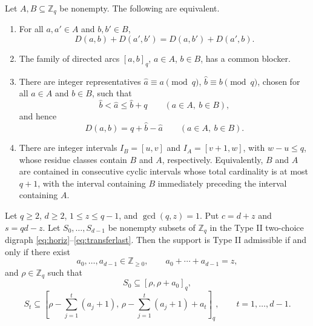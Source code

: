 \documentclass[10pt,a4paper]{amsart}
\begin{document}
\begin{lemma}
\label{lem:separation}
Let $A,B\subseteq\mathbb Z_q$ be nonempty.  The following are equivalent.
\begin{enumerate}[label=\textup{(\roman*)}]
\item For all $a,a'\in A$ and $b,b'\in B$,
\begin{equation}
        D(a,b)+D(a',b')=D(a,b')+D(a',b).
        \label{eq:monge}
\end{equation}
\item The family of directed arcs $[a,b]_q$, $a\in A$, $b\in B$, has a common blocker.
\item There are integer representatives $\widehat a\equiv a\pmod q$, $\widehat b\equiv b\pmod q$, chosen for all $a\in A$ and $b\in B$, such that
\begin{equation}
        \widehat b<\widehat a\le \widehat b+q
        \qquad(a\in A,\ b\in B),
        \label{eq:separated-lifts-order}
\end{equation}
 and hence
\begin{equation}
        D(a,b)=q+\widehat b-\widehat a
        \qquad(a\in A,\ b\in B).
        \label{eq:separated-lifts-distance}
\end{equation}
\item There are integer intervals $I_B=[u,v]$ and $I_A=[v+1,w]$, with $w-u\le q$, whose residue classes contain $B$ and $A$, respectively.  Equivalently, $B$ and $A$ are contained in consecutive cyclic intervals whose total cardinality is at most $q+1$, with the interval containing $B$ immediately preceding the interval containing $A$.
\end{enumerate}
\end{lemma}

\begin{theorem}
\label{thm:support}
Let $q\ge2$, $d\ge2$, $1\le z\le q-1$, and $\gcd(q,z)=1$. Put $c=d+z$ and $s=qd-z$. Let $S_0,\ldots,S_{d-1}$ be nonempty subsets of $\mathbb Z_q$ in the Type II two-choice digraph \eqref{eq:horiz}--\eqref{eq:transferlast}. Then the support is Type II admissible if and only if there exist
\[
        a_0,\ldots,a_{d-1}\in\mathbb Z_{\ge0},
        \qquad a_0+\cdots+a_{d-1}=z,
\]
and $\rho\in\mathbb Z_q$ such that
\begin{equation}
        S_0\subseteq [\rho,\rho+a_0]_q,
        \label{eq:S0a}
\end{equation}
\begin{equation}
        S_t\subseteq
        \left[
        \rho-\sum_{j=1}^t(a_j+1),\,
        \rho-\sum_{j=1}^t(a_j+1)+a_t
        \right]_q,
        \qquad t=1,\ldots,d-1 .
        \label{eq:Sta}
\end{equation}
\end{theorem}
\end{document}
